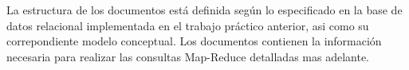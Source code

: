 La estructura de los documentos está definida según lo especificado en la base de datos relacional implementada en el trabajo práctico anterior,
asi como su correpondiente modelo conceptual. Los documentos contienen la información necesaria para realizar las consultas Map-Reduce
detalladas mas adelante.\\
